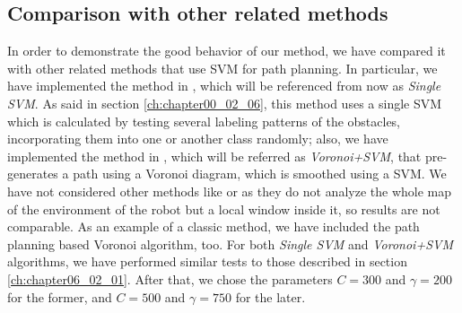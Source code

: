 \subsection{Comparison with other related methods}\label{ch:chapter06_02_02}

In order to demonstrate the good behavior of our method, we have compared it with other related methods that use \ac{SVM} for path planning. In particular, we have implemented the method in \cite{miura2006support}, which will be referenced from now as \textit{Single \ac{SVM}}. As said in section \ref{ch:chapter00_02_06}, this method uses a single \ac{SVM} which is calculated by testing several labeling patterns of the obstacles, incorporating them into one or another class randomly; also, we have implemented the method in \cite{yang2012safe}, which will be referred as \textit{Voronoi+\ac{SVM}}, that pre-generates a path using a Voronoi diagram, which is smoothed using a \ac{SVM}. We have not considered other methods like \cite{sarkar2008mobile} or \cite{qingyang2012local} as they do not analyze the whole map of the environment of the robot but a local window inside it, so results are not comparable. As an example of a classic method, we have included the path planning based Voronoi algorithm, too.
For both \textit{Single \ac{SVM}} and \textit{Voronoi+\ac{SVM}} algorithms, we have performed similar tests to those described in section \ref{ch:chapter06_02_01}. After that, we chose the parameters $C=300$ and $\gamma=200$ for the former, and $C=500$ and $\gamma=750$ for the later.

